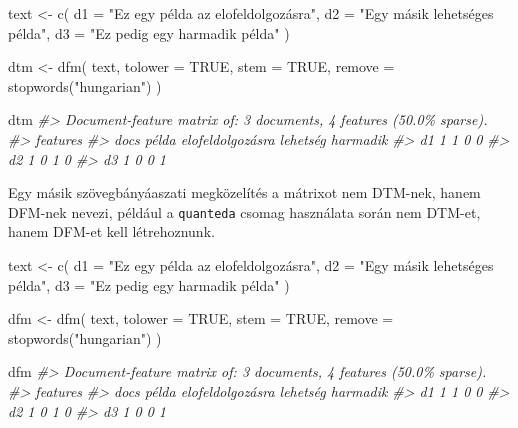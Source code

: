 \documentclass[
]{book}
\newenvironment{Shaded}{\begin{snugshade}}{\end{snugshade}}
\newcommand{\AttributeTok}[1]{\textcolor[rgb]{0.77,0.63,0.00}{#1}}
\newcommand{\CommentTok}[1]{\textcolor[rgb]{0.56,0.35,0.01}{\textit{#1}}}
\newcommand{\ConstantTok}[1]{\textcolor[rgb]{0.00,0.00,0.00}{#1}}
\newcommand{\FunctionTok}[1]{\textcolor[rgb]{0.00,0.00,0.00}{#1}}
\newcommand{\NormalTok}[1]{#1}
\newcommand{\OtherTok}[1]{\textcolor[rgb]{0.56,0.35,0.01}{#1}}
\newcommand{\StringTok}[1]{\textcolor[rgb]{0.31,0.60,0.02}{#1}}
\begin{document}
\begin{Shaded}
\begin{Highlighting}[]

\NormalTok{text }\OtherTok{\textless{}{-}} \FunctionTok{c}\NormalTok{(}
  \AttributeTok{d1 =} \StringTok{"Ez egy példa az elofeldolgozásra"}\NormalTok{,}
  \AttributeTok{d2 =} \StringTok{"Egy másik lehetséges példa"}\NormalTok{,}
  \AttributeTok{d3 =} \StringTok{"Ez pedig egy harmadik példa"}
\NormalTok{)}

\NormalTok{dtm }\OtherTok{\textless{}{-}} \FunctionTok{dfm}\NormalTok{(}
\NormalTok{  text,}
  \AttributeTok{tolower =} \ConstantTok{TRUE}\NormalTok{, }\AttributeTok{stem =} \ConstantTok{TRUE}\NormalTok{,}
  \AttributeTok{remove =} \FunctionTok{stopwords}\NormalTok{(}\StringTok{"hungarian"}\NormalTok{)}
\NormalTok{)}

\NormalTok{dtm}
\CommentTok{\#\textgreater{} Document{-}feature matrix of: 3 documents, 4 features (50.0\% sparse).}
\CommentTok{\#\textgreater{}     features}
\CommentTok{\#\textgreater{} docs példa elofeldolgozásra lehetség harmadik}
\CommentTok{\#\textgreater{}   d1     1                1        0        0}
\CommentTok{\#\textgreater{}   d2     1                0        1        0}
\CommentTok{\#\textgreater{}   d3     1                0        0        1}
\end{Highlighting}
\end{Shaded}

Egy másik szövegbányáaszati megközelítés a mátrixot nem DTM-nek, hanem
DFM-nek nevezi, például a \texttt{quanteda} csomag használata során nem
DTM-et, hanem DFM-et kell létrehoznunk.

\begin{Shaded}
\begin{Highlighting}[]

\NormalTok{text }\OtherTok{\textless{}{-}} \FunctionTok{c}\NormalTok{(}
  \AttributeTok{d1 =} \StringTok{"Ez egy példa az elofeldolgozásra"}\NormalTok{,}
  \AttributeTok{d2 =} \StringTok{"Egy másik lehetséges példa"}\NormalTok{,}
  \AttributeTok{d3 =} \StringTok{"Ez pedig egy harmadik példa"}
\NormalTok{)}

\NormalTok{dfm }\OtherTok{\textless{}{-}} \FunctionTok{dfm}\NormalTok{(}
\NormalTok{  text,}
  \AttributeTok{tolower =} \ConstantTok{TRUE}\NormalTok{, }\AttributeTok{stem =} \ConstantTok{TRUE}\NormalTok{,}
  \AttributeTok{remove =} \FunctionTok{stopwords}\NormalTok{(}\StringTok{"hungarian"}\NormalTok{)}
\NormalTok{)}

\NormalTok{dfm}
\CommentTok{\#\textgreater{} Document{-}feature matrix of: 3 documents, 4 features (50.0\% sparse).}
\CommentTok{\#\textgreater{}     features}
\CommentTok{\#\textgreater{} docs példa elofeldolgozásra lehetség harmadik}
\CommentTok{\#\textgreater{}   d1     1                1        0        0}
\CommentTok{\#\textgreater{}   d2     1                0        1        0}
\CommentTok{\#\textgreater{}   d3     1                0        0        1}
\end{Highlighting}
\end{Shaded}
\end{document}
